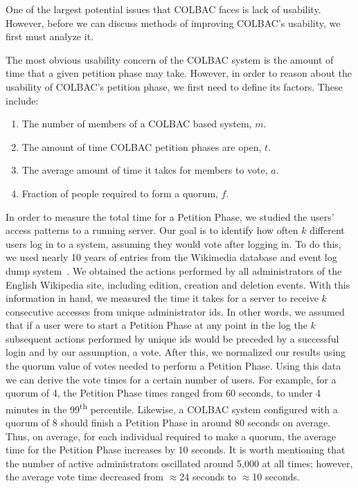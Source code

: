 One of the largest potential issues that COLBAC faces is lack of usability.
However, before we can discuss methods of improving COLBAC's usability, we first
must analyze it. 

The most obvious usability concern of the COLBAC system is the amount of time
that a given petition phase may take. However, in order to reason about the
usability of COLBAC's petition phase, we first need to define its factors. These
include:
\begin{enumerate}
\item The number of members of a COLBAC based system, $m$.
\item The amount of time COLBAC petition phases are open, $t$.
\item The average amount of time it takes for members to vote, $a$.
\item Fraction of people required to form a quorum, $f$.
\end{enumerate}


In order to measure the total time for a Petition Phase, we studied the
users’ access patterns to a running server. Our goal is to identify how often
$k$ different users log in to a system, assuming they would vote after logging
in. To do this, we used nearly 10 years of entries from the Wikimedia database
and event log dump system~\cite{wikidata}. We obtained the actions performed by
all administrators of the English Wikipedia site, including edition, creation
and deletion events. With this information in hand, we measured the time it
takes for a server to receive $k$ consecutive accesses from unique administrator
ids. In other words, we assumed that if a user were to start a Petition Phase at
any point in the log the $k$ subsequent actions performed by unique ids would be
preceded by a successful login and by our assumption, a vote. After this, we
normalized our results using the quorum value of votes needed to perform a
Petition Phase. 
Using this data we can derive the vote times for a certain number of users. For
example, for a quorum of 4, the Petition Phase times ranged from 60
seconds, to under 4 minutes in the 99\textsuperscript{th} percentile. Likewise, a
COLBAC system configured with a quorum of 8 should finish a Petition Phase
in around 80 seconds on average. Thus, on average, for each individual required to
make a quorum, the average time for the Petition Phase increases by 10 seconds. 
It is worth mentioning that the number of active administrators oscillated around
5,000 at all times; however, the average vote time decreased from $\approx$24
seconds to $\approx$10 seconds.

